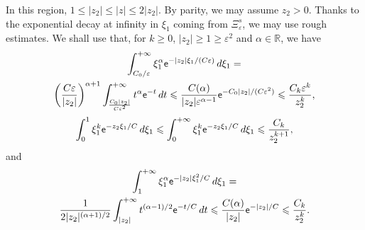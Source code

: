 \documentclass[AHL,Unicode,longabstracts,published]{cedram}
\newcommand*\R{\mathbb R}
\newcommand*\ex{{\sf e}}
\newcommand*\ii{\infty}
\newcommand*\gs{\geqslant }
\newcommand*\ls{\leqslant }
\newcommand*\e{\varepsilon}
\begin{document}
In this region, $ 1 \ls |z_2| \ls |z| \ls 2 |z_2 |$. By parity, we may assume $ z_2 > 0 $. Thanks to the exponential decay at infinity in $ \xi_1 $ coming from $ \Xi^s_\e $, we may use rough estimates. We shall use that, for $k \gs 0 $, $ |z_2 | \gs 1 \gs \e^2 $ and $ \alpha \in \R $, we have
\begin{multline}\label{tool2_far}
\int_{C_0 /\e}^{+\ii} \xi_1^\alpha \ex^{- |z_2| \xi_1/ (C \e)} \, d\xi_1 =\\
\left(\frac{C \e}{|z_2|} \right)^{\alpha+1} \int_{ \frac{C_0 |z_2|}{C \e^2}}^{+\ii} t^\alpha \ex^{- t} \, dt
\ls \frac{ C(\alpha)}{|z_2| \e^{\alpha-1}} \ex^{- C_0 |z_2| / (C \e^2)}
\ls \frac{C_k \e^k }{ z_2^k },
\end{multline}
\begin{equation}\label{tool1_far}
\int_0^1 \xi_1^{k} \ex^{- z_2 \xi_1 / C } \, d\xi_1
\ls \int_0^{+\ii} \xi_1^{k} \ex^{- z_2 \xi_1 / C } \, d\xi_1
\ls \frac{C_k}{ z_2^{k+1}},
\end{equation}
and
\begin{multline}\label{tool3_far}
\int_{ 1}^{+\ii} \xi_1^\alpha \ex^{- |z_2| \xi_1^2/ C} \, d\xi_1  =\\
\frac{1}{2 |z_2|^{(\alpha+1)/2} } \int_{ |z_2| }^{+\ii} t^{(\alpha -1)/2 } \ex^{- t / C } \, dt \ls \frac{ C(\alpha)}{|z_2| } \ex^{- |z_2| / C }\ls \frac{C_k }{ z_2^k }.
\end{multline}
\end{document}
